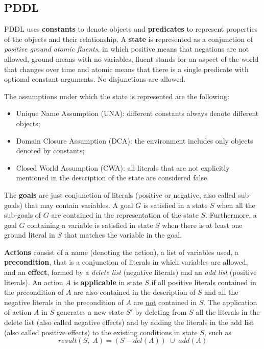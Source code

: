 \documentclass{article}
\begin{document}
\subsection{PDDL}
PDDL uses \textbf{constants} to denote objects and \textbf{predicates} to represent properties of the objects and their relationship. A \textbf{state} is represented as a conjunction of \textit{positive ground atomic fluents}, in which positive means that negations are not allowed, ground means with no variables, fluent stands for an aspect of the world that changes over time and atomic means that there is a single predicate with optional constant arguments. No disjunctions are allowed. 

The assumptions under which the state is represented are the following:
\begin{itemize}
    \item Unique Name Assumption (UNA): different constants always denote different objects;
    \item Domain Closure Assumption (DCA): the environment includes only objects denoted by constants;
    \item Closed World Assumption (CWA): all literals that are not explicitly mentioned in the description of the state are considered false.
\end{itemize}

The \textbf{goals} are just conjunction of literals (positive or negative, also called sub-goals) that may contain variables. A goal $G$ is satisfied in a state $S$ when all the sub-goals of $G$ are contained in the representation of the state $S$. Furthermore, a goal $G$ containing a variable is satisfied in state $S$ when there is at least one ground literal in $S$ that matches the variable in the goal.    

\textbf{Actions} consist of a name (denoting the action), a list of variables used, a \textbf{precondition}, that is a conjunction of literals in which variables are allowed, and an \textbf{effect}, formed by a \textit{delete list} (negative literals) and an \textit{add list} (positive literals). An action $A$ is \textbf{applicable} in state $S$ if all positive literals contained in the precondition of $A$ are also contained in the description of $S$ and all the negative literals in the precondition of $A$ are \underline{not} contained in $S$.
The application of action $A$ in $S$ generates a new state $S'$ by deleting from $S$ all the literals in the delete list (also called negative effects) and by adding the literals in the add list (also called positive effects) to the existing conditions in state $S$, such as
\[result(S,\;A) = (S - del(A)) \;\cup\; add(A)\]
\end{document}
